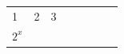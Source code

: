 {\begin{tabular}[t]{|l|l|l|l|l|l|l|l|}
    
        1 &
    
    
        2 &
    
    
        3%
     \tabularnewline\cline{1-1}\cline{2-2}\cline{3-3}\cline{4-4}\cline{5-5}\cline{6-6}\cline{7-7}\cline{8-8}
    
    
        
                \begin{math}{2}^{x}\end{math}
               &
    
    
         &
    
    
         &
    
    
         &
    
    
         &
    

\end{tabular}}
